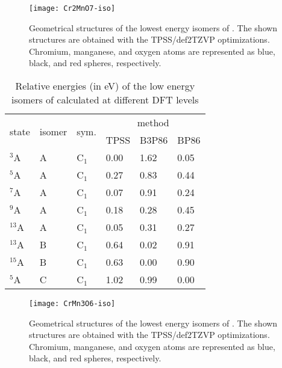 \begin{figure}
	\centering
	\texttt{[image: Cr2MnO7-iso]}
	\caption{Geometrical structures of the lowest energy isomers of . The shown structures are obtained with the TPSS/def2TZVP optimizations. Chromium, manganese, and oxygen atoms are represented as blue, black, and red spheres, respectively.}
	\label{figs:Cr2MnO7}
\end{figure}



\begin{table}[]
	\centering
	\caption{Relative energies (in eV) of the low energy isomers of  calculated at different DFT levels}
\begin{tabular}{@{}llllll@{}}
\toprule
\multirow{2}{*}{state} & \multirow{2}{*}{isomer} & \multirow{2}{*}{sym.} & \multicolumn{3}{c}{method} \\ \cmidrule(l){4-6} 
         &        &         & TPSS   & B3P86 & BP86   \\ \midrule
$^3$A      & A      & C$_1$   & 0.00   & 1.62  & 0.05 \\
$^5$A      & A      & C$_1$   & 0.27   & 0.83  & 0.44 \\
$^7$A      & A      & C$_1$   & 0.07   & 0.91  & 0.24 \\
$^9$A      & A      & C$_1$   & 0.18   & 0.28  & 0.45 \\
$^{13}$A   & A      & C$_1$   & 0.05   & 0.31  & 0.27 \\
$^{13}$A   & B      & C$_1$   & 0.64   & 0.02  & 0.91 \\
$^{15}$A   & B      & C$_1$   & 0.63   & 0.00  & 0.90 \\
$^5$A      & C      & C$_1$   & 1.02   & 0.99  & 0.00 \\ \bottomrule
\end{tabular}
\label{tbl:CrMn3O6}
\end{table}	


\begin{figure}
	\centering
	\texttt{[image: CrMn3O6-iso]}
	\caption{Geometrical structures of the lowest energy isomers of . The shown structures are obtained with the TPSS/def2TZVP optimizations. Chromium, manganese, and oxygen atoms are represented as blue, black, and red spheres, respectively.}
	\label{figs:CrMn3O6}
\end{figure}







